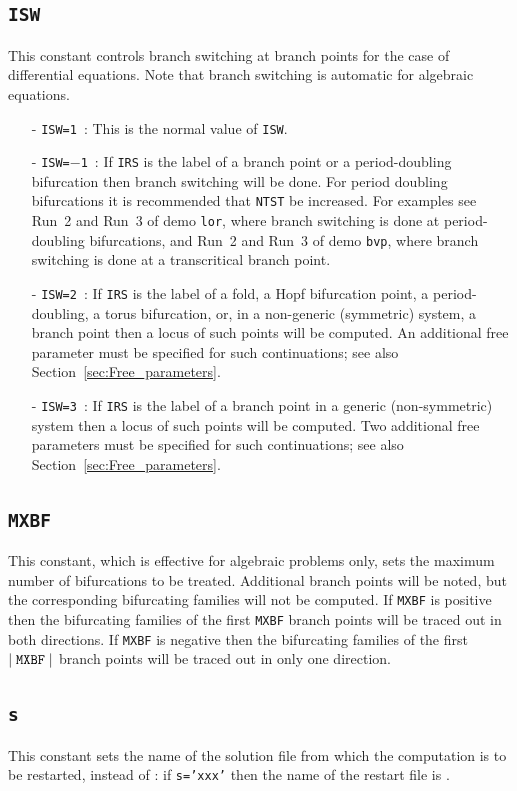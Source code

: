\documentclass[12pt]{report}
\def\abs#1{\mid#1\mid}
\begin{document}
\subsection{\texttt{ISW}}  \label{sec:ISW}
 This constant controls branch switching at branch points for the case
 of differential equations.
 Note that branch switching is automatic for algebraic equations.
\begin{itemize}
\item[-] {\tt ISW=1}~: This is the normal value of {\tt ISW}.
\item[-] {\tt ISW=$-$1}~:
  If {\tt IRS} is the label of a branch point or a period-doubling
  bifurcation then branch switching will be done.
  For period doubling bifurcations it is recommended that {\tt NTST} be increased.
  For examples see Run~2 and Run~3 of demo {\tt lor}, where branch switching
  is done at period-doubling bifurcations, and Run~2 and Run~3 of demo {\tt bvp},
  where branch switching is done at a transcritical branch point.
\item[-] {\tt ISW=2}~:
  If {\tt IRS} is the label of a fold, a Hopf bifurcation point, 
  a period-doubling, a torus bifurcation, or, in a non-generic
  (symmetric) system, a branch point then a locus of such points will be
  computed. An additional free parameter must be specified for such 
  continuations; see also Section~\ref{sec:Free_parameters}.
\item[-] {\tt ISW=3}~:
  If {\tt IRS} is the label of a branch point in a generic
  (non-symmetric) system then a locus of such points will be
  computed. Two additional free parameters must be specified for such 
  continuations; see also Section~\ref{sec:Free_parameters}.
\end{itemize}

\subsection{\texttt{MXBF}}  \label{sec:MXBF}
 This constant, which is effective for algebraic problems only,
 sets the maximum number of bifurcations to be treated.
 Additional branch points will be noted, but the corresponding bifurcating
 families will not be computed.
 If {\tt MXBF} is positive then the bifurcating families of the first {\tt MXBF}
  branch points will be traced out in both directions.
 If {\tt MXBF} is negative then the bifurcating families of the first 
 $\abs{{\tt MXBF}}$ branch points will be traced out in only one direction. 

\subsection{\texttt{s}}  \label{sec:s}
This constant sets the name of the solution file from which the computation
is to be restarted, instead of : if {\tt s='xxx'} then the
name of the restart file is .
\end{document}
